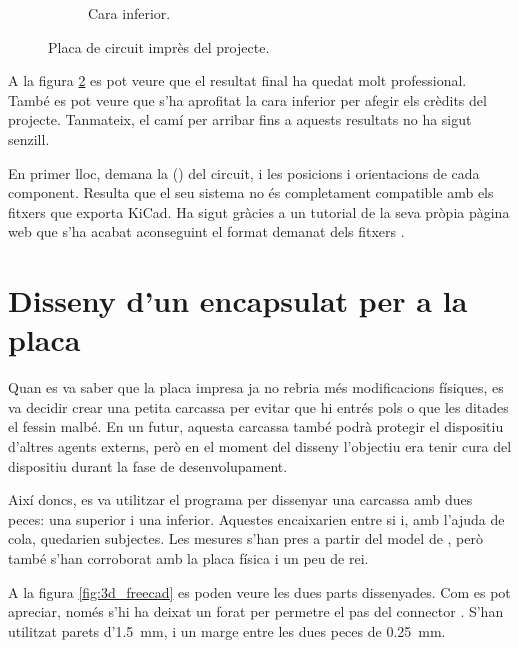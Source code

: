 \begin{figure}[ht]
\begin{subfigure}{0.45\textwidth}
        \caption{Cara inferior.}
        \label{fig:printedpcb_bottom}
    \end{subfigure}
    \caption{Placa de circuit imprès del projecte.}
    \label{fig:printedpcb}
\end{figure}

A la figura \ref{fig:printedpcb} es pot veure que el resultat final ha quedat 
molt professional. També es pot veure que s'ha aprofitat la cara inferior
per afegir els crèdits del projecte. Tanmateix, el camí per arribar fins
a aquests resultats no ha sigut senzill.

En primer lloc,  demana la  ()
del circuit, i les posicions i orientacions de cada component. Resulta que el
seu sistema no és completament compatible amb els fitxers que exporta
KiCad. Ha sigut gràcies a un tutorial de la seva pròpia pàgina web que s'ha
acabat aconseguint el format demanat dels fitxers \cite{KiCADJLC}.

\section{Disseny d'un encapsulat per a la placa}

Quan es va saber que la placa impresa ja no rebria més modificacions físiques,
es va decidir crear una petita carcassa per evitar que hi entrés pols o que les
ditades el fessin malbé. En un futur, aquesta carcassa també podrà protegir
el dispositiu d'altres agents externs, però en el moment del disseny l'objectiu
era tenir cura del dispositiu durant la fase de desenvolupament.

Així doncs, es va utilitzar el programa  per dissenyar una
carcassa amb dues peces: una superior i una inferior. Aquestes encaixarien entre
si i, amb l'ajuda de cola, quedarien subjectes. Les mesures s'han pres a partir
del model de , però també s'han corroborat amb la placa física i un
peu de rei.

A la figura \ref{fig:3d_freecad} es poden veure les dues parts dissenyades. Com es pot
apreciar, només s'hi ha deixat un forat per permetre el pas del connector
. S'han utilitzat parets d'\SI{1.5}{\milli\meter}, i un marge entre
les dues peces de \SI{0.25}{\milli\meter}.

